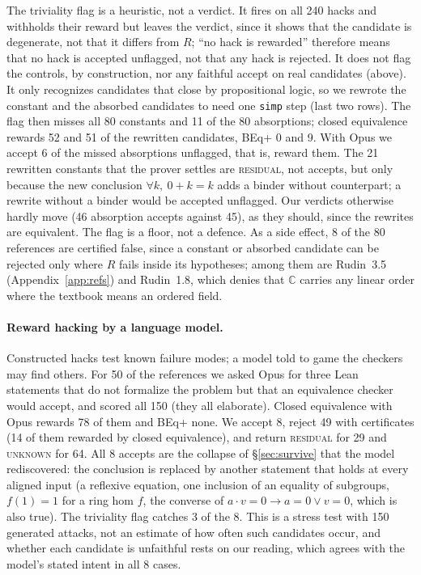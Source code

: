 \documentclass[10pt]{article}
\theoremstyle{definition}
\newcommand{\V}[1]{\textsc{#1}}
\begin{document}
The triviality flag is a heuristic, not a verdict. It fires on all 240 hacks and withholds their
reward but leaves the verdict, since it shows that the candidate is degenerate, not that it
differs from $R$; ``no hack is rewarded'' therefore means that no hack is accepted unflagged, not
that any hack is rejected. It does not flag the controls, by construction, nor any faithful
accept on real candidates (above). It only recognizes candidates that close by propositional
logic, so we rewrote the constant and the absorbed candidates to need one \texttt{simp} step
(last two rows). The flag then misses all 80 constants and 11 of the 80 absorptions; closed
equivalence rewards 52 and 51 of the rewritten candidates, BEq+ 0 and 9. With Opus we accept 6
of the missed absorptions unflagged, that is, reward them. The 21 rewritten constants that the
prover settles are \V{residual}, not accepts, but only because the new conclusion
$\forall k,\ 0+k=k$ adds a binder without counterpart; a rewrite without a binder would be
accepted unflagged. Our verdicts otherwise hardly move (46 absorption accepts against 45), as
they should, since the rewrites are equivalent. The flag is a floor, not a defence. As a side
effect, 8 of the 80 references are certified false, since a constant or
absorbed candidate can be rejected only where $R$ fails inside its hypotheses; among them are
Rudin~3.5 (Appendix~\ref{app:refs}) and Rudin~1.8, which denies that $\mathbb C$ carries any linear
order where the textbook means an ordered field.

\paragraph{Reward hacking by a language model.} Constructed hacks test known failure modes; a
model told to game the checkers may find others. For 50 of the references we asked Opus for three
Lean statements that do not formalize the problem but that an equivalence checker would accept,
and scored all 150 (they all elaborate). Closed equivalence with Opus rewards 78 of them and BEq+
none. We accept 8, reject 49 with certificates (14 of them rewarded by closed equivalence), and
return \V{residual} for 29 and \V{unknown} for 64. All 8 accepts are the collapse of
\S\ref{sec:survive} that the model rediscovered: the conclusion is replaced by another statement
that holds at every aligned input (a reflexive equation, one inclusion of an equality of
subgroups, $f(1)=1$ for a ring hom $f$, the converse of $a\cdot v=0\to a=0\vee v=0$, which is
also true). The triviality flag catches 3 of the 8. This is a stress test with 150 generated
attacks, not an estimate of how often such candidates occur, and whether each candidate is
unfaithful rests on our reading, which agrees with the model's stated intent in all 8 cases.
\end{document}
